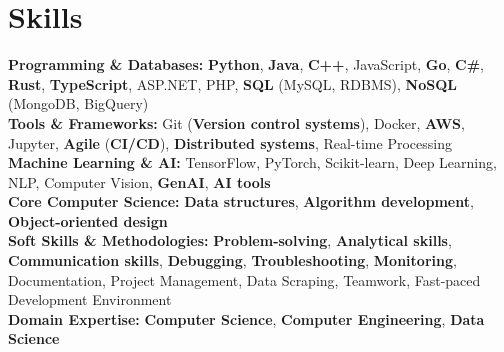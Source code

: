\documentclass[a4paper,10pt]{article}
\begin{document}
\section*{Skills}
\textbf{Programming \& Databases: } \textbf{Python}, \textbf{Java}, \textbf{C++}, JavaScript, \textbf{Go}, \textbf{C\#}, \textbf{Rust}, \textbf{TypeScript}, ASP.NET, PHP, \textbf{SQL} (MySQL, RDBMS), \textbf{NoSQL} (MongoDB, BigQuery) \\
\textbf{Tools \& Frameworks:} Git (\textbf{Version control systems}), Docker, \textbf{AWS}, Jupyter, \textbf{Agile} (\textbf{CI/CD}), \textbf{Distributed systems}, Real-time Processing\\
\textbf{Machine Learning \& AI: } TensorFlow, PyTorch, Scikit-learn, Deep Learning, NLP, Computer Vision, \textbf{GenAI}, \textbf{AI tools} \\
\textbf{Core Computer Science:} \textbf{Data structures}, \textbf{Algorithm development}, \textbf{Object-oriented design} \\
\textbf{Soft Skills \& Methodologies: } \textbf{Problem-solving}, \textbf{Analytical skills}, \textbf{Communication skills}, \textbf{Debugging}, \textbf{Troubleshooting}, \textbf{Monitoring}, Documentation, Project Management, Data Scraping, Teamwork, Fast-paced Development Environment \\
\textbf{Domain Expertise:} \textbf{Computer Science}, \textbf{Computer Engineering}, \textbf{Data Science} \\

\vspace{-4mm}
\end{document}
